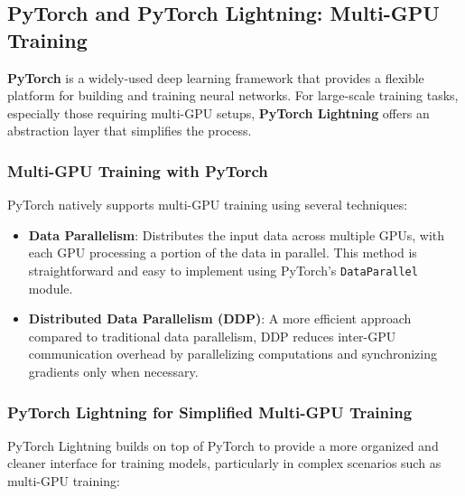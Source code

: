 \subsection{PyTorch and PyTorch Lightning: Multi-GPU Training}

\textbf{PyTorch} is a widely-used deep learning framework that provides a flexible platform for building and training neural networks. For large-scale training tasks, especially those requiring multi-GPU setups, \textbf{PyTorch Lightning} offers an abstraction layer that simplifies the process.

\subsubsection{Multi-GPU Training with PyTorch}

PyTorch natively supports multi-GPU training using several techniques:

\begin{itemize}
    \item \textbf{Data Parallelism}: Distributes the input data across multiple GPUs, with each GPU processing a portion of the data in parallel. This method is straightforward and easy to implement using PyTorch's \texttt{DataParallel} module.
    \item \textbf{Distributed Data Parallelism (DDP)}: A more efficient approach compared to traditional data parallelism, DDP reduces inter-GPU communication overhead by parallelizing computations and synchronizing gradients only when necessary.
\end{itemize}

\subsubsection{PyTorch Lightning for Simplified Multi-GPU Training}

PyTorch Lightning builds on top of PyTorch to provide a more organized and cleaner interface for training models, particularly in complex scenarios such as multi-GPU training:

